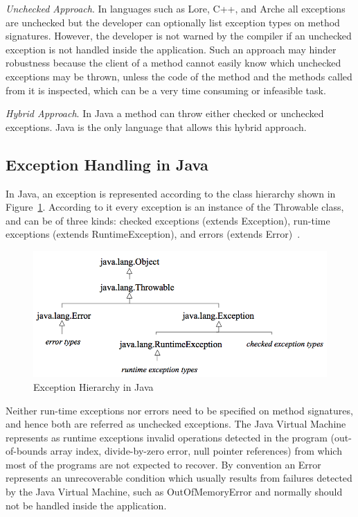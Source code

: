 \documentclass[conference]{IEEEtran}
\begin{document}
\noindent\emph{Unchecked Approach}. In languages such as Lore, C++, and Arche
all exceptions are unchecked but the developer can optionally list exception
types on method signatures. However, the developer is not warned by the compiler
if an unchecked exception is not handled inside the application. Such an
approach may hinder robustness because the client of a method cannot easily know
which unchecked exceptions may be thrown, unless the code of the method and the
methods called from it is inspected, which can be a very time consuming or
infeasible task.

\noindent\emph{Hybrid Approach}. In Java a method can throw either checked or
unchecked exceptions. Java is the only language that allows this hybrid
approach.

\subsection{Exception Handling in Java} \label{sec:extypes}

In Java, an exception is represented according to the class hierarchy shown in
Figure~\ref{fig:exchier}.  According to it every exception is an
instance of the Throwable class, and can be of three kinds: checked exceptions
(extends Exception), run-time exceptions (extends RuntimeException), and errors
(extends Error)~\cite{gosling2000java}.

\begin{figure} \centering \includegraphics[width=\hsize]{new2_hierarchy.png}
  \caption{Exception Hierarchy in Java} \label{fig:exchier} \end{figure}

Neither run-time exceptions nor errors need to be specified on method
signatures, and hence both are referred as unchecked exceptions. The Java
Virtual Machine represents as runtime exceptions invalid operations detected in
the program (out-of-bounds array index, divide-by-zero error, null pointer
references) from which most of the programs are not expected to recover. By
convention an Error represents an unrecoverable condition which usually results
from failures detected by the Java Virtual Machine, such as OutOfMemoryError and
normally should not be handled inside the application.
\end{document}
